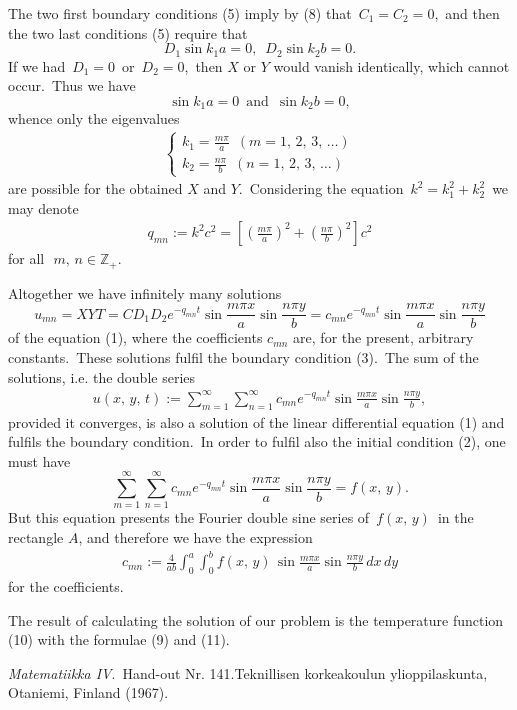 \documentclass[12pt]{article}
\theoremstyle{definition}
\begin{document}
The two first boundary conditions (5) imply by (8) that\, $C_1 = C_2 = 0$,\, and then the two last conditions (5) require that
$$D_1\sin{k_1a} = 0,\,\,\, D_2\sin{k_2b} = 0.$$
If we had\, $D_1 = 0$\, or\, $D_2 = 0$,\, then $X$ or $Y$ would vanish identically, which cannot occur.\, Thus we have
$$\sin{k_1a} = 0\,\,\, \mathrm{and}\,\,\, \sin{k_2b} = 0,$$
whence only the eigenvalues
\begin{align*}
\begin{cases}
  k_1 = \frac{m\pi}{a}\,\,\,(m = 1,\,2,\,3,\,\ldots)\\
  k_2 = \frac{n\pi}{b}\,\,\,(n = 1,\,2,\,3,\,\ldots)
\end{cases}
\end{align*}
are possible for the obtained $X$ and $Y$.\, Considering the equation\, $k^2 = k_1^2+k_2^2$\, we may denote
\begin{align}
 q_{mn} := k^2c^2 =
\left[\left(\frac{m\pi}{a}\right)^2\!+\!\left(\frac{n\pi}{b}\right)^2\right]c^2
\end{align}
 for all\,\, $m,\,n \in \mathbb{Z}_+.$

Altogether we have infinitely many solutions
$$u_{mn} = XYT = CD_1D_2e^{-q_{mn}t}\sin\frac{m\pi x}{a}\sin\frac{n\pi y}{b}
= c_{mn}e^{-q_{mn}t}\sin\frac{m\pi x}{a}\sin\frac{n\pi y}{b}$$
of the equation (1), where the coefficients $c_{mn}$ are, for the present, arbitrary constants.\, These solutions fulfil the boundary condition (3).\, The sum of the solutions, i.e. the double series
\begin{align}
  u(x,\,y,\,t) := \sum_{m=1}^\infty\sum_{n=1}^\infty 
  c_{mn}e^{-q_{mn}t}\sin\frac{m\pi x}{a}\sin\frac{n\pi y}{b},
\end{align}
provided it converges, is also a solution of the linear differential equation (1) and fulfils the boundary condition.\, In order to fulfil also the initial condition (2), one must have
$$\sum_{m=1}^\infty\sum_{n=1}^\infty 
c_{mn}e^{-q_{mn}t}\sin\frac{m\pi x}{a}\sin\frac{n\pi y}{b} = f(x,\,y).$$
But this equation presents the Fourier double sine series  of\, $f(x,\,y)$\, in the rectangle $A$, and therefore we have the expression
\begin{align}  
c_{mn} := \frac{4}{ab}
\int_0^a\!\int_0^b f(x,\,y)\,\sin\frac{m\pi x}{a}\sin\frac{n\pi y}{b}\,dx\,dy
\end{align}
for the coefficients.

The result of calculating the solution of our problem is the temperature function (10) with the formulae (9) and (11).

\begin{thebibliography}{9}
 {\em Matematiikka IV}.\, Hand-out Nr. 141.\quad Teknillisen korkeakoulun ylioppilaskunta, Otaniemi, Finland (1967).
\end{thebibliography}
 



\end{document}
